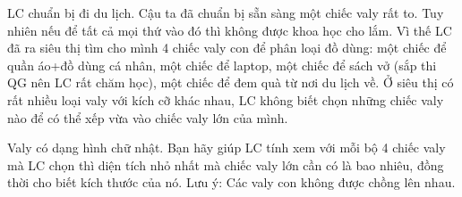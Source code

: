 LC chuẩn bị đi du lịch. Cậu ta đã chuẩn bị sẵn sàng một chiếc valy rất to. Tuy nhiên nếu để tất cả mọi thứ vào đó thì không được khoa học cho lắm. Vì thế LC đã ra siêu thị tìm cho mình 4 chiếc valy con để phân loại đồ dùng: một chiếc để quần áo+đồ dùng cá nhân, một chiếc để laptop, một chiếc để sách vở (sắp thi QG nên LC rất chăm học), một chiếc để đem quà từ nơi du lịch về. Ở siêu thị có rất nhiều loại valy với kích cỡ khác nhau, LC không biết chọn những chiếc valy nào để có thể xếp vừa vào chiếc valy lớn của mình.

Valy có dạng hình chữ nhật. Bạn hãy giúp LC tính xem với mỗi bộ 4 chiếc valy mà LC chọn thì diện tích nhỏ nhất mà chiếc valy lớn cần có là bao nhiêu, đồng thời cho biết kích thước của nó. Lưu ý: Các valy con không được chồng lên nhau.